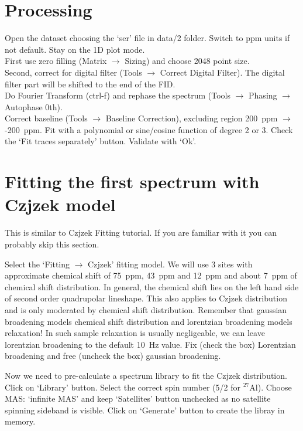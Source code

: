 \documentclass[11pt,a4paper]{article}
\begin{document}
\section{Processing}
Open the dataset choosing the `ser' file in data/2 folder. Switch to ppm units if not default.
Stay on the 1D plot mode.\\
First use zero filling (Matrix $\rightarrow$ Sizing) and choose 2048 point size. \\
Second, correct for digital filter (Tools $\rightarrow$ Correct Digital Filter). The digital filter part will be shifted to the end of the FID.\\
Do Fourier Transform (ctrl-f) and rephase the spectrum (Tools $\rightarrow$ Phasing $\rightarrow$ Autophase 0th).\\
Correct baseline (Tools $\rightarrow$ Baseline Correction), excluding region 200~ppm $\rightarrow$ -200~ppm. Fit with a polynomial or sine/cosine function of degree 2 or 3. 
Check the `Fit traces separately' button.
Validate with `Ok'.

\section{Fitting the first spectrum with Czjzek model}
This is similar to Czjzek Fitting tutorial. If you are familiar with it you can probably skip this section.

Select the `Fitting $\rightarrow$ Czjzek' fitting model. We will use 3 sites with approximate chemical shift of 75~ppm, 43~ppm and 12~ppm and about 7~ppm of 
chemical shift distribution. In general, the chemical shift lies on the left hand side of second order quadrupolar lineshape. This also applies to Czjzek distribution and is 
only moderated by chemical shift distribution. Remember that gaussian broadening models chemical shift distribution and lorentzian broadening models relaxation!
In such sample relaxation is usually negligeable, we can leave lorentzian broadening to the default 10~Hz value. Fix (check the box) Lorentzian broadening and free 
(uncheck the box) gaussian broadening.

Now we need to pre-calculate a spectrum library to fit the Czjzek distribution. Click on `Library' button. Select the correct spin number (5/2 for $\mathrm{{}^{27}Al}$).
Choose MAS: `infinite MAS' and keep `Satellites' button unchecked as no satellite spinning sideband is visible. Click on `Generate' button to create the libray in memory.
\end{document}
